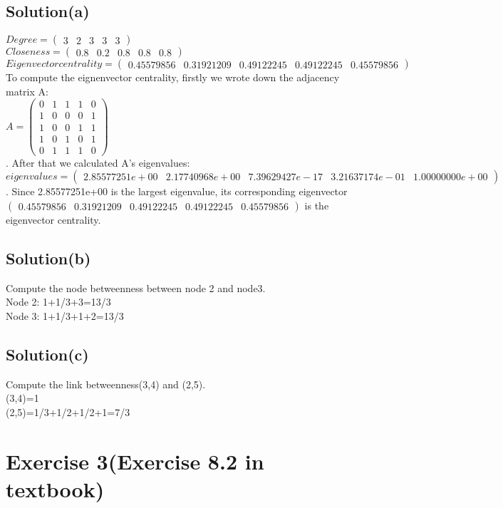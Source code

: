 \documentclass[12pt]{article}%
\begin{document}
\subsection {Solution(a)}
$Degree =\left(\begin{matrix}3&2&3&3&3\end{matrix}\right)$\\
$Closeness =\left(\begin{matrix}0.8&0.2&0.8&0.8&0.8\end{matrix}\right)$\\
$Eigenvector  centrality=\left(\begin{matrix}0.45579856 &0.31921209 &0.49122245&0.49122245 &0.45579856\end{matrix}\right)$
To compute the eignenvector centrality, firstly we wrote down the adjacency matrix A:\\
$A = \left(\begin{matrix} 0&1&1&1&0
\\1& 0&0&0&1
\\1&0&0&1&1
\\1&0&1&0&1
\\0&1&1&1&0\end{matrix}\right)$
 \\. After that we calculated A's eigenvalues:\\
 $eigenvalues= \left(\begin{matrix}2.85577251e+00&2.17740968e+00&7.39629427e-17&3.21637174e-01&1.00000000e+00\end{matrix}\right)$. Since 2.85577251e+00 is the largest eigenvalue, its corresponding eigenvector $\left(\begin{matrix}0.45579856 &0.31921209 &0.49122245&0.49122245 &0.45579856\end{matrix}\right)$ is the eigenvector centrality.
\subsection {Solution(b)}
Compute the node betweenness between node 2 and node3.\\
Node 2: 1+1/3+3=13/3\\
Node 3: 1+1/3+1+2=13/3
\subsection {Solution(c)}
Compute the link betweenness(3,4) and (2,5).\\
(3,4)=1\\
(2,5)=1/3+1/2+1/2+1=7/3
\section{Exercise 3(Exercise 8.2 in textbook) }
\end{document}
